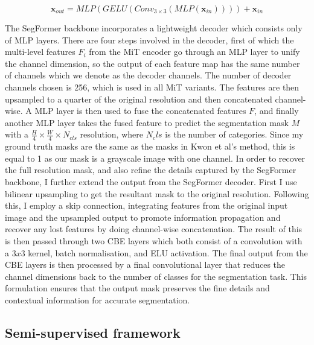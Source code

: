 \documentclass[11pt]{ociamthesis}  %
\begin{document}
\noindent
\begin{equation}
    \textbf{x}_{out} = MLP(GELU(Conv_{3 \times 3}(MLP(\textbf{x}_{in})))) + \textbf{x}_{in}
    \label{Eq:Mix-FFN equation}
\end{equation}

The SegFormer backbone incorporates a lightweight decoder which consists only of MLP layers. There are four steps involved in the decoder, first of which the multi-level features $F_i$ from the MiT encoder go through an MLP layer to unify the channel dimension, so the output of each feature map has the same number of channels which we denote as the decoder channels. The number of decoder channels chosen is 256, which is used in all MiT variants. The features are then upsampled to a quarter of the original resolution and then concatenated channel-wise. A MLP layer is then used to fuse the concatenated features $F$, and finally another MLP layer takes the fused feature to predict the segmentation mask $M$ with a $\frac{H}{4} \times \frac{W}{4} \times N_{cls}$ resolution, where $N_cls$ is the number of categories. Since my ground truth masks are the same as the masks in Kwon et al's\cite{Kwon} method, this is equal to 1 as our mask is a grayscale image with one channel. In order to recover the full resolution mask, and also refine the details captured by the SegFormer backbone, I further extend the output from the SegFormer decoder. First I use bilinear upsampling to get the resultant mask to the original resolution. Following this, I employ a skip connection, integrating features from the original input image and the upsampled output to promote information propagation and recover any lost features by doing channel-wise concatenation. The result of this is then passed through two CBE layers which both consist of a convolution with a $3x3$ kernel, batch normalisation, and ELU activation. The final output from the CBE layers is then processed by a final convolutional layer that reduces the channel dimensions back to the number of classes for the segmentation task. This formulation ensures that the output mask preserves the fine details and contextual information for accurate segmentation. 

\subsection{Semi-supervised framework}
\end{document}
